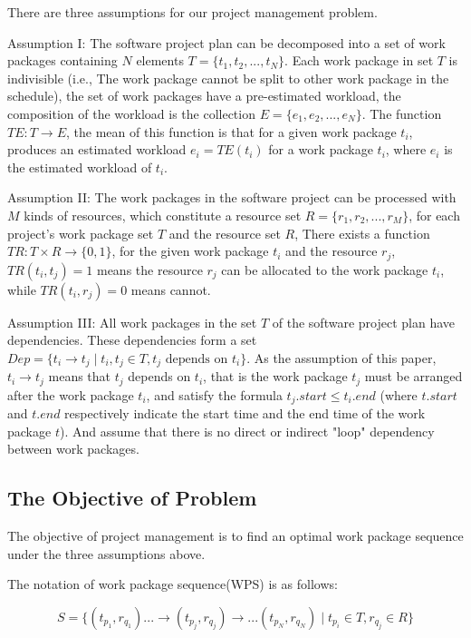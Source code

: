 %
There are three assumptions for our project management problem.


Assumption I: The software project plan can be decomposed into a set of
work packages containing $N$ elements $T = \{t_1, t_2, ..., t_N \}$.
Each work package in set $T$ is indivisible (i.e., The work package cannot be
split to other work package in the schedule), the set of work packages have a
pre-estimated workload, the composition of the workload is the collection
$E = \{e _1, e_2, ..., e_N \}$. The function $TE: T \rightarrow E$,
the mean of this function is that for a given work package $t_i$, produces an
estimated workload $e_i = TE(t_i)$ for a work package $t_i$, where $e_i$ is the
estimated workload of $t_i$.


Assumption II: The work packages in the software project  can be
processed with $M$ kinds of resources, which constitute a resource set
$R = \{r_1, r_2, ..., r_M \}$, for each project's work package set $T$ and the
resource set $R$, There exists a function $TR: T \times R \rightarrow \{0, 1\}$,
for the given work package $t_i$ and the resource $r_j$, $TR(t_i, t_j) = 1$
means the resource $r_j$ can be allocated to the work package $t_i$, while
$TR(t_i, r_j) = 0$ means cannot.


Assumption III: All work packages in the set $T$ of the software project
plan have dependencies. These dependencies form a set
$Dep= \{t_i \rightarrow t_j \mid t_i, t_j \in T, t_j \text{ depends on } t_i\}$.
As the assumption of this paper, $t_i \rightarrow t_j$ means that $t_j$ depends
on $t_i$, that is the work package $t_j$ must be arranged after the work
package $t_i$, and satisfy the formula $t_j.start \leq t_i.end$ (where $t.start$
and $t.end$ respectively indicate the start time and the end time of the work
package $t$).  And assume that there is no direct or indirect "loop" dependency
between work packages.


\subsection{The Objective of Problem}
%
The objective of project management is to find an optimal work package sequence
under the three assumptions above.

The notation of work package sequence(WPS) is as follows:

\begin{equation}
  S = \{
  (t_{p_1}, r_{q_1}) ... \rightarrow (t_{p_j}, r_{q_j}) \rightarrow ... (t_{p_N}, r_{q_N})
  \mid t_{p_i} \in T, r_{q_j} \in R
  \}
  \label{wps}
\end{equation}

